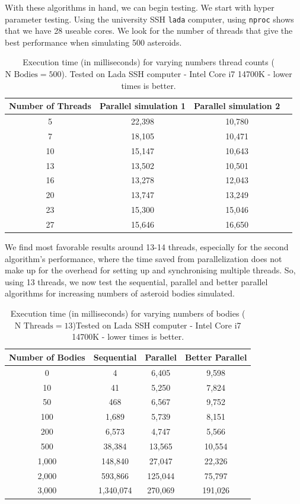 \documentclass{article}
\begin{document}
With these algorithms in hand, we can begin testing. We start with hyper parameter testing. Using the university SSH \texttt{lada} computer, using \texttt{nproc} shows that we have 28 useable cores. We look for the number of threads that give the best performance when simulating 500 asteroids.

\begin{table}[htbp]
\centering
\begin{tabular}{|c|c|c|c|}
\hline
\textbf{Number of Threads} & \textbf{Parallel simulation 1} & \textbf{Parallel simulation 2} \\
\hline
5     & 22,398  & 10,780       \\
7     & 18,105  & 10,471    \\
10    & 15,147  & 10,643   \\
13    & 13,502  & 10,501   \\
16    & 13,278  & 12,043   \\
20    & 13,747  & 13,249   \\
23    & 15,300  & 15,046  \\
27    & 15,646  & 16,650 \\
\hline
\end{tabular}
\caption{Execution time (in milliseconds) for varying numbers thread counts ($\text{N Bodies} = 500$). Tested on Lada SSH computer - Intel Core i7 14700K - lower times  is better.}
\label{tab:thread_performance}
\end{table}

We find most favorable results around 13-14 threads, especially for the second algorithm's performance, where the time saved from parallelization does not make up for the overhead for setting up and synchronising multiple threads. So, using 13 threads, we now test the sequential, parallel and better parallel algorithms for increasing numbers of asteroid bodies simulated.

\begin{table}[htbp]
\centering
\begin{tabular}{|c|c|c|c|}
\hline
\textbf{Number of Bodies} & \textbf{Sequential} & \textbf{Parallel} & \textbf{Better Parallel} \\
\hline
0     & 4  & 6,405    & 9,598     \\
10     & 41  & 5,250  & 7,824   \\
50    & 468  & 6,567  & 9,752   \\
100   & 1,689  & 5,739  & 8,151   \\
200 & 6,573 & 4,747 & 5,566 \\ 
500 & 38,384 & 13,565 & 10,554 \\
1,000  &  148,840 & 27,047  &  22,326  \\
2,000 & 593,866 & 125,044 & 75,797 \\
3,000 & 1,340,074 & 270,069 & 191,026 \\
\hline
\end{tabular}
\caption{Execution time (in milliseconds) for varying numbers of bodies ($\text{N Threads} = 13$)Tested on Lada SSH computer - Intel Core i7 14700K - lower times is better.}
\label{tab:thread_performance}
\end{table}
\end{document}
